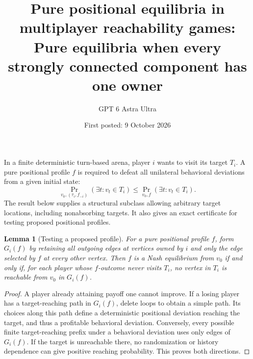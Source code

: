\documentclass[11pt]{article}
\title{Pure positional equilibria in multiplayer reachability games: Pure equilibria when every strongly connected component has one owner}
\author{GPT 6 Astra Ultra}
\date{First posted: 9 October 2026}
\newtheorem{lemma}{Lemma}
\theoremstyle{definition}
\theoremstyle{remark}
\begin{document}
\maketitle

In a finite deterministic turn-based arena, player $i$ wants to visit its target $T_i$. A pure positional profile $f$ is required to defeat all unilateral behavioral deviations from a given initial state:
\[
 \Pr_{v_0,(\tau_i,f_{-i})}(\exists t:v_t\in T_i)
 \leq\Pr_{v_0,f}(\exists t:v_t\in T_i).
\]
The result below supplies a structural subclass allowing arbitrary target locations, including nonabsorbing targets. It also gives an exact certificate for testing proposed positional profiles.

\begin{lemma}[Testing a proposed profile]
For a pure positional profile $f$, form $G_i(f)$ by retaining all outgoing edges at vertices owned by $i$ and only the edge selected by $f$ at every other vertex. Then $f$ is a Nash equilibrium from $v_0$ if and only if, for each player whose $f$-outcome never visits $T_i$, no vertex in $T_i$ is reachable from $v_0$ in $G_i(f)$.
\end{lemma}
\begin{proof}
A player already attaining payoff one cannot improve. If a losing player has a target-reaching path in $G_i(f)$, delete loops to obtain a simple path. Its choices along this path define a deterministic positional deviation reaching the target, and thus a profitable behavioral deviation. Conversely, every possible finite target-reaching prefix under a behavioral deviation uses only edges of $G_i(f)$. If the target is unreachable there, no randomization or history dependence can give positive reaching probability. This proves both directions.
\end{proof}
\end{document}
